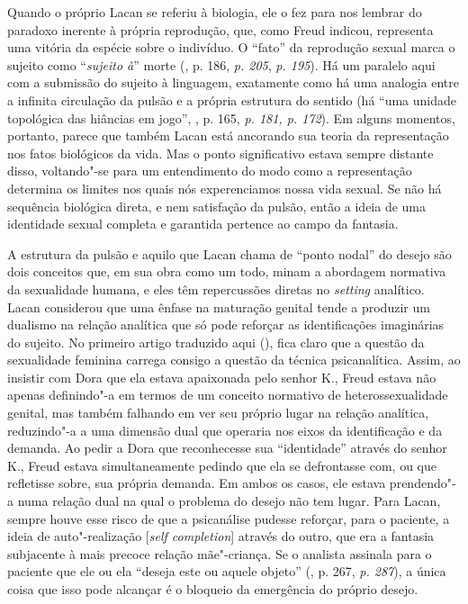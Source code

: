 Quando o próprio Lacan se referiu à biologia, ele o fez para nos lembrar
do paradoxo inerente à própria reprodução, que, como Freud indicou,
representa uma vitória da espécie sobre o indivíduo. O ``fato'' da
reprodução sexual marca o sujeito como ``\emph{sujeito à}'' morte (,
p. 186, \emph{p. 205}, \emph{p. 195}). Há um paralelo aqui com a
submissão do sujeito à linguagem, exatamente como há uma analogia entre
a infinita circulação da pulsão e a própria estrutura do sentido (há
``uma unidade topológica das hiâncias em jogo'', , p. 165, \emph{p.
181, p. 172}). Em alguns momentos, portanto, parece que também Lacan
está ancorando sua teoria da representação nos fatos biológicos da vida.
Mas o ponto significativo estava sempre distante disso, voltando"-se para
um entendimento do modo como a representação determina os limites nos
quais nós experenciamos nossa vida sexual. Se não há sequência biológica
direta, e nem satisfação da pulsão, então a ideia de uma identidade
sexual completa e garantida pertence ao campo da fantasia.

A estrutura da pulsão e aquilo que Lacan chama de ``ponto nodal'' do
desejo são dois conceitos que, em sua obra como um todo, minam a
abordagem normativa da sexualidade humana, e eles têm repercussões
diretas no \emph{setting} analítico. Lacan considerou que uma ênfase na
maturação genital tende a produzir um dualismo na relação analítica que
só pode reforçar as identificações imaginárias do sujeito. No primeiro
artigo traduzido aqui (), fica claro que a questão da sexualidade
feminina carrega consigo a questão da técnica psicanalítica. Assim, ao
insistir com Dora que ela estava apaixonada pelo senhor K., Freud estava
não apenas definindo"-a em termos de um conceito normativo de
heterossexualidade genital, mas também falhando em ver seu próprio lugar
na relação analítica, reduzindo"-a a uma dimensão dual que operaria nos
eixos da identificação e da demanda. Ao pedir a Dora que reconhecesse
sua ``identidade'' através do senhor K., Freud estava simultaneamente
pedindo que ela se defrontasse com, ou que refletisse sobre, sua própria
demanda. Em ambos os casos, ele estava prendendo"-a numa relação dual na
qual o problema do desejo não tem lugar. Para Lacan, sempre houve esse
risco de que a psicanálise pudesse reforçar, para o paciente, a ideia de
auto"-realização {[}\emph{self completion}{]} através do outro, que era a
fantasia subjacente à mais precoce relação mãe"-criança. Se o analista
assinala para o paciente que ele ou ela ``deseja este ou aquele objeto''
(, p. 267, \emph{p. 287}), a única coisa que isso pode alcançar é o
bloqueio da emergência do próprio desejo.

